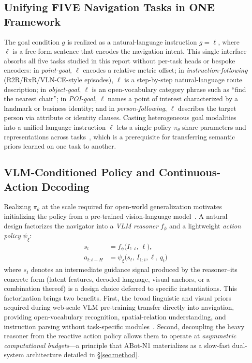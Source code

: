 \subsection{Unifying FIVE Navigation Tasks in ONE Framework}
\label{sec:prelim-tasks}

The goal condition $g$ is realized as a natural-language instruction
$g=\ell$, where $\ell$ is a free-form sentence that encodes the
navigation intent. This single interface absorbs
all five tasks studied in this report without per-task heads or
bespoke encoders: in \textit{point-goal}, $\ell$ encodes a relative
metric offset; in \textit{instruction-following}
(R2R/RxR/VLN-CE-style episodes), $\ell$ is a step-by-step natural-language
route description; in \textit{object-goal}, $\ell$ is an open-vocabulary
category phrase such as ``find the nearest chair''; in \textit{POI-goal},
$\ell$ names a point of interest characterized by a landmark or
business identity; and in \textit{person-following}, $\ell$ describes
the target person via attribute or identity clauses.
Casting heterogeneous goal modalities into a unified language instruction
$\ell$ lets a single policy $\pi_\theta$ share parameters and
representations across tasks~\cite{zhang2025navfom,abotn0,zhang2024uninavid},
which is a prerequisite for transferring semantic priors learned on one
task to another.

\subsection{VLM-Conditioned Policy and Continuous-Action Decoding}
\label{sec:prelim-vlm}
Realizing $\pi_\theta$ at the scale required for open-world
generalization motivates initializing the policy from a pre-trained
vision-language
model~\cite{bai2023qwenvl,chen2024spatialvlm,physicalintelligence2024pi05}.
A natural design factorizes the navigator into a \emph{VLM reasoner}
$f_\phi$ and a lightweight \emph{action policy} $\psi_\xi$:
\begin{align}
s_t &= f_\phi\!\bigl(I_{1:t},\,\ell\bigr),
\label{eq:vlm-reason}\\
a_{t:t+H} &= \psi_\xi\!\bigl(s_t,\,I_{1:t},\ell,\,q_t\bigr)
\label{eq:action-head}
\end{align}
where $s_t$ denotes an intermediate guidance signal produced by the
reasoner--its concrete form (latent features, decoded language, visual
anchors, or a combination thereof) is a design choice deferred to
specific instantiations.
This factorization brings two benefits.
First, the broad linguistic and visual priors acquired during
web-scale VLM pre-training transfer directly into navigation,
providing open-vocabulary recognition, spatial-relation understanding,
and instruction parsing without task-specific
modules~\cite{bai2023qwenvl,chen2024spatialvlm,cheng2024spatialrgpt}.
Second, decoupling the heavy reasoner from the reactive action policy
allows them to operate at \emph{asymmetric computational
budgets}---a principle that ABot-N1 materializes as a slow-fast
dual-system architecture detailed in \S\ref{sec:method}.
